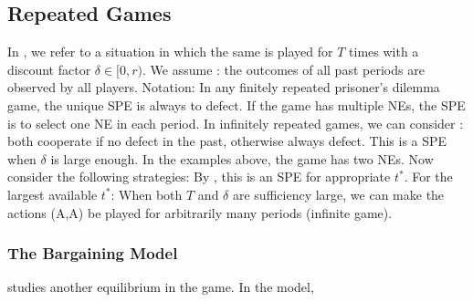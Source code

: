 \documentclass[12pt]{report}
\begin{document}
\subsection{Repeated Games}

In , we refer to a situation in which the same  is played for $T$ times with a discount factor $\delta\in[0,r)$. 
We assume : the outcomes of all past periods are observed by all players. Notation:
In any finitely repeated prisoner's dilemma game, the unique SPE is always to defect. If the game has multiple NEs, the SPE is to select one NE in each period. 
In infinitely repeated games, we can consider : both cooperate if no defect in the past, otherwise always defect. This is a SPE when $\delta$ is large enough. 
In the examples above, the game has two NEs. Now consider the following strategies:
By , this is an SPE for appropriate $t^*$. For the largest available $t^*$:
When both $T$ and $\delta$ are sufficiency large, we can make the actions (A,A) be played for arbitrarily many periods (infinite game). 

\subsubsection{The Bargaining Model}
\cite{Rubinstein1982} studies another equilibrium in the game. In the model, 
\end{document}
